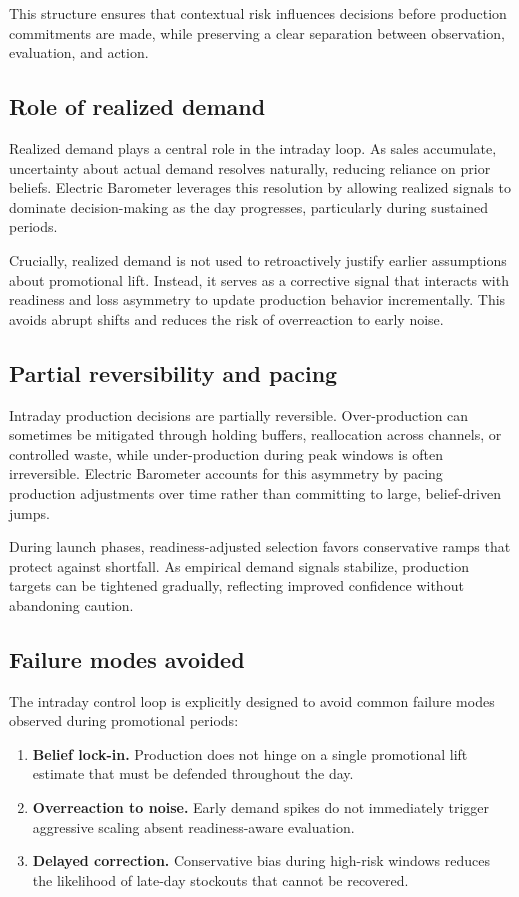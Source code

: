 This structure ensures that contextual risk influences decisions before production commitments are
made, while preserving a clear separation between observation, evaluation, and action.

\subsection{Role of realized demand}
\label{subsec:realized-demand}

Realized demand plays a central role in the intraday loop. As sales accumulate, uncertainty about
actual demand resolves naturally, reducing reliance on prior beliefs. Electric Barometer leverages
this resolution by allowing realized signals to dominate decision-making as the day progresses,
particularly during sustained \LTO{} periods.

Crucially, realized demand is not used to retroactively justify earlier assumptions about promotional
lift. Instead, it serves as a corrective signal that interacts with readiness and loss asymmetry to
update production behavior incrementally. This avoids abrupt shifts and reduces the risk of
overreaction to early noise.

\subsection{Partial reversibility and pacing}
\label{subsec:reversibility}

Intraday production decisions are partially reversible. Over-production can sometimes be mitigated
through holding buffers, reallocation across channels, or controlled waste, while under-production
during peak windows is often irreversible. Electric Barometer accounts for this asymmetry by
pacing production adjustments over time rather than committing to large, belief-driven jumps.

During \LTO{} launch phases, readiness-adjusted selection favors conservative ramps that protect
against shortfall. As empirical demand signals stabilize, production targets can be tightened
gradually, reflecting improved confidence without abandoning caution.

\subsection{Failure modes avoided}
\label{subsec:failure-modes}

The intraday control loop is explicitly designed to avoid common failure modes observed during
promotional periods:
\begin{enumerate}[leftmargin=*, itemsep=2pt]
  \item \textbf{Belief lock-in.} Production does not hinge on a single promotional lift estimate that
  must be defended throughout the day.
  \item \textbf{Overreaction to noise.} Early demand spikes do not immediately trigger aggressive
  scaling absent readiness-aware evaluation.
  \item \textbf{Delayed correction.} Conservative bias during high-risk windows reduces the
  likelihood of late-day stockouts that cannot be recovered.
\end{enumerate}

